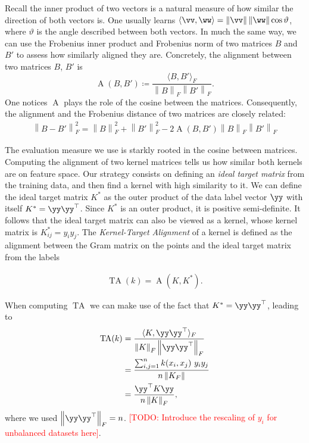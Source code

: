\documentclass[twocolumn,superscriptaddress,nofootinbib]{revtex4-2}
\DeclareMathOperator{\TA}{TA} %
\newcommand{\Norm}[1]{\left\lVert #1 \right\rVert}
\newcommand{\todo}[1]{\textcolor{red}{[TODO: #1]}}
\begin{document}
    Recall the inner product of two vectors is a natural measure of how similar the direction of both vectors is.
    One usually learns $\langle\vv,\ww\rangle=\Norm{\vv}\Norm{\ww}\cos{\vartheta}$, where $\vartheta$ is the angle described between both vectors.
    In much the same way, we can use the Frobenius inner product and Frobenius norm of two matrices $B$ and $B'$ to assess how similarly aligned they are.
    Concretely, the alignment between two matrices $B$, $B'$ is
    \begin{equation}
        \operatorname{A}(B, B') \coloneqq \frac{\langle B, B'\rangle_F}{\Norm{B}_F \Norm{B'}_F}.
    \end{equation}
    One notices $\operatorname{A}$ plays the role of the cosine between the matrices.
    Consequently, the alignment and the Frobenius distance of two matrices are closely related:
    \begin{align*}
        \Norm{B-B'}_F^2 =\Norm{B}_F^2 +\Norm{B'}_F^2 - 2\operatorname{A}(B,B') \Norm{B}_F \Norm{B'}_F
    \end{align*}
    
    The evaluation measure we use is starkly rooted in the cosine between matrices.
    Computing the alignment of two kernel matrices tells us how similar both kernels are on feature space.
    Our strategy consists on defining an \emph{ideal target matrix} from the training data, and then find a kernel with high similarity to it.
    We can define the ideal target matrix $K^\ast$ as the outer product of the data label vector $\yy$ with itself $K^\ast = \yy\yy^\top$.
    Since $K^\ast$ is an outer product, it is positive semi-definite.
    It follows that the ideal target matrix can also be viewed as a kernel, whose kernel matrix is $K^\ast_{ij}=y_i y_j$.
    The \emph{Kernel-Target Alignment} of a kernel is defined as the alignment between the Gram matrix on the points and the ideal target matrix from the labels
    
    \begin{align}
        \TA(k) = \operatorname{A}(K,K^\ast).
    \end{align}
    
    When computing $\TA$ we can make use of the fact that $K^\ast = \yy\yy^\top$, leading to
    \begin{align}
        \TA(k) & = \frac{\langle K,\yy\yy^\top\rangle_F}{\Norm{K}_F\Norm{\yy\yy^\top}_F} \\
        & = \frac{\sum_{i,j=1}^n k(x_i,x_j)\,\, y_i y_j}{n \Norm{K_F}} \label{eq:polarisation}\\
        & = \frac{\yy^\top K\yy}{n \Norm{K}_F},
    \end{align}
    where we used $\Norm{\yy\yy^\top}_F = n$. \todo{Introduce the rescaling of $y_i$ for unbalanced datasets here}.
    
\end{document}
